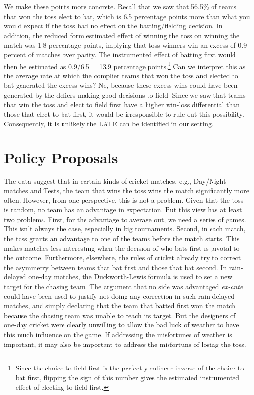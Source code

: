\documentclass[12pt, letterpaper]{article}
\begin{document}
We make these points more concrete. Recall that we saw that 56.5\% of teams that won the toss elect to bat, which is 6.5 percentage points more than what you would expect if the toss had no effect on the batting/fielding decision. In addition, the reduced form estimated effect of winning the toss on winning the match was 1.8 percentage points, implying that toss winners win an excess of 0.9 percent of matches over parity. The instrumented effect of batting first would then be estimated as 0.9/6.5 = 13.9 percentage points.\footnote{Since the choice to field first is the perfectly colinear inverse of the choice to bat first, flipping the sign of this number gives the estimated instrumented effect of electing to field first.} Can we interpret this as the average rate at which the complier teams that won the toss and elected to bat generated the excess wins? No, because these excess wins could have been generated by the defiers making good decisions to field. Since we saw that teams that win the toss and elect to field first have a higher win-loss differential than those that elect to bat first, it would be irresponsible to rule out this possibility. Consequently, it is unlikely the LATE can be identified in our setting.

\section{Policy Proposals}

The data suggest that in certain kinds of cricket matches, e.g., Day/Night matches and Tests, the team that wins the toss wins the match significantly more often. However, from one perspective, this is not a problem. Given that the toss is random, no team has an advantage in expectation. But this view has at least two problems. First, for the advantage to average out, we need a series of games. This isn't always the case, especially in big tournaments. Second, in each match, the toss grants an advantage to one of the teams before the match starts. This makes matches less interesting when the decision of who bats first is pivotal to the outcome. Furthermore, elsewhere, the rules of cricket already try to correct the asymmetry between teams that bat first and those that bat second. In rain-delayed one-day matches, the Duckworth-Lewis formula is used to set a new target for the chasing team. The argument that no side was advantaged \emph{ex-ante} could have been used to justify not doing any correction in such rain-delayed matches, and simply declaring that the team that batted first won the match because the chasing team was unable to reach its target. But the designers of one-day cricket were clearly unwilling to allow the bad luck of weather to have this much influence on the game. If addressing the misfortunes of weather is important, it may also be important to address the misfortune of losing the toss.
\end{document}

